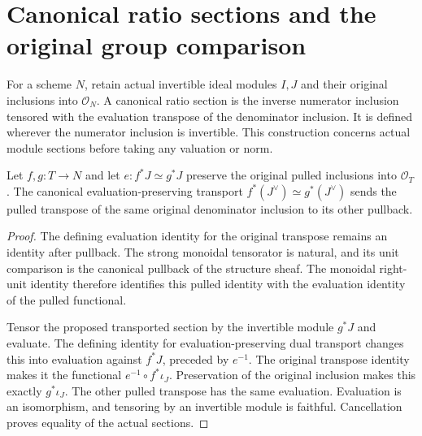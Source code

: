 \section{Canonical ratio sections and the original group comparison}

For a scheme $N$, retain actual invertible ideal modules $I,J$ and their
original inclusions into $\mathcal O_N$. A canonical ratio section is
the inverse numerator inclusion tensored with the evaluation transpose
of the denominator inclusion. It is defined wherever the numerator
inclusion is invertible. This construction concerns actual module
sections before taking any valuation or norm.

\begin{lemma}
\label{lem:original-pl-ratio-pulled-functional-transport}
\leanok
Let $f,g:T\to N$ and let $e:f^*J\simeq g^*J$ preserve the original
pulled inclusions into $\mathcal O_T$. The canonical evaluation-preserving
transport $f^*(J^\vee)\simeq g^*(J^\vee)$ sends the pulled transpose
of the same original denominator inclusion to its other pullback.
\end{lemma}
\begin{proof}
The defining evaluation identity for the original transpose remains an
identity after pullback. The strong monoidal tensorator is natural,
and its unit comparison is the canonical pullback of the structure
sheaf. The monoidal right-unit identity therefore identifies this
pulled identity with the evaluation identity of the pulled functional.

Tensor the proposed transported section by the invertible module
$g^*J$ and evaluate. The defining identity for evaluation-preserving
dual transport changes this into evaluation against $f^*J$, preceded
by $e^{-1}$. The original transpose identity makes it the functional
$e^{-1}\circ f^*\iota_J$. Preservation of the original inclusion makes
this exactly $g^*\iota_J$. The other pulled transpose has the same
evaluation. Evaluation is an isomorphism, and tensoring by an invertible
module is faithful. Cancellation proves equality of the actual sections.
\end{proof}

